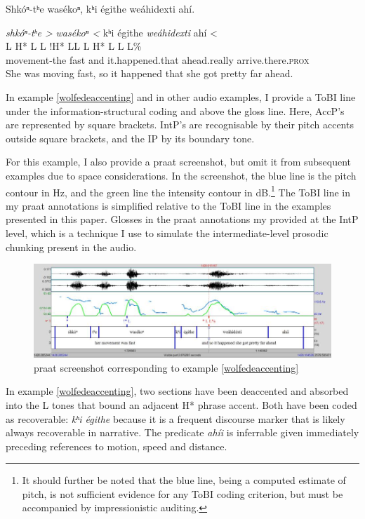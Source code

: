 \documentclass[output=paper]{LSP/langsci}
\begin{document}
\ea\label{wolfedeaccenting}
Shkóⁿ-tʰe wasékoⁿ, kʰi égithe weáhidexti ahí.\footnotemark

\glll 	\emph{shkóⁿ-tʰe >}	\emph{wasékoⁿ <}		kʰi 		égithe 		\emph{weáhidexti}		{ahí <}\\
	{\ob L H* L\cb}		{\ob L !H* L\cb{}L}		{\ob L}	{}			{H* L}				{\cb{}L L\%}\\
	movement-the 		fast 				and 		it.happened.that 	ahead.really	 		arrive.there.\textsc{prox}\\
\glt She was moving fast, so it happened that she got pretty far ahead.
\z

In example \ref{wolfedeaccenting} and in other audio examples, I provide a ToBI line under the information-structural coding and above the gloss line. Here, AccP’s are represented by square brackets. IntP’s are recognisable by their pitch accents outside square brackets, and the IP by its boundary tone. 

For this example, I also provide a praat screenshot, but omit it from subsequent examples due to space considerations. In the screenshot, the blue line is the pitch contour in Hz, and the green line the intensity contour in dB.\footnote{It should further be noted that the blue line, being a computed estimate of pitch, is not sufficient evidence for any ToBI coding criterion, but must be accompanied by impressionistic auditing.} The ToBI line in my praat annotations is simplified relative to the ToBI line in the examples presented in this paper. Glosses in the praat annotations my provided at the IntP level, which is a technique I use to simulate the intermediate-level prosodic chunking present in the audio.

\begin{figure}\includegraphics[width=12cm]{figures/Gordon1}\caption{praat screenshot corresponding to example \ref{wolfedeaccenting}}\label{wolfedeaccentingscreenshot}\end{figure}

In example \ref{wolfedeaccenting}, two sections have been deaccented and absorbed into the L tones that bound an adjacent H* phrase accent. Both have been coded as recoverable: \textit{kʰi égithe} because it is a frequent discourse marker that is likely always recoverable in narrative. The predicate \textit{ahíi} is inferrable given immediately preceding references to motion, speed and distance.
\end{document}
